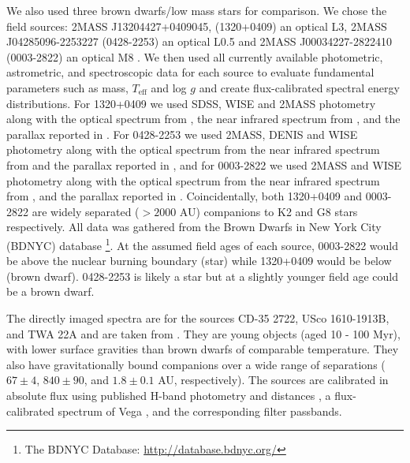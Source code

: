 \documentclass[twocolumn]{aastex61}
\begin{document}
We also used three brown dwarfs/low mass stars for comparison. We chose the field sources: 2MASS J13204427+0409045, (1320+0409) an optical L3, 2MASS J04285096-2253227 (0428-2253) an optical L0.5 and 2MASS J00034227-2822410 (0003-2822) an optical M8 \citep[see][]{filippazzo15}.  We then used all currently available photometric, astrometric, and spectroscopic data for each source to evaluate fundamental parameters such as mass, $T_\mathrm{eff}$ and log $g$ \citep{filippazzo15, faherty16} and create flux-calibrated spectral energy distributions.  For 1320+0409 we used SDSS, WISE and 2MASS photometry along with the optical spectrum from \cite{reid08}, the near infrared spectrum from \cite{bardalez14}, and the parallax reported in \cite{2012ApJ...752...56F}. For 0428-2253 we used 2MASS, DENIS and WISE photometry along with the optical spectrum from \cite{2003A&A...403..929K} the near infrared spectrum from \cite{bardalez14} and the parallax reported in \cite{2014AJ....147...94D}, and for 0003-2822 we used 2MASS and WISE photometry along with the optical spectrum from \cite{2007AJ....133..439C} the near infrared spectrum from \cite{2018AJ....155...34C}, and the parallax reported in \cite{2010AJ....139..176F}.  Coincidentally, both 1320+0409 and 0003-2822 are widely separated ($> 2000$ AU) companions to K2 and G8 stars respectively.  All data was gathered from the Brown Dwarfs in New York City (BDNYC) database \citep{filippazzo15}\footnote{The BDNYC Database: \url{http://database.bdnyc.org/}}.  At the assumed field ages of each source, 0003-2822 would be above the nuclear burning boundary (star) while 1320+0409 would be below (brown dwarf).  0428-2253 is likely a star but at a slightly younger field age could be a brown dwarf.

The directly imaged spectra are for the sources CD-35 2722, USco 1610-1913B, and TWA 22A and are taken from \cite{wahhaj11, aller13, bonnefoy14}. They are young objects (aged 10 - 100 Myr), with lower surface gravities than brown dwarfs of comparable temperature. They also have gravitationally bound companions over a wide range of separations ($67\pm4$, $840\pm90$, and $1.8\pm0.1$ AU, respectively). The sources are calibrated in absolute flux using published H-band photometry \citep{wahhaj11, aller13, bonnefoy09} and distances \citep{gaia16, teixeira09}, a flux-calibrated spectrum of Vega \citep{1985A&A...151..399M, 1985IAUS..111..225H}, and the corresponding filter passbands.  
\end{document}
